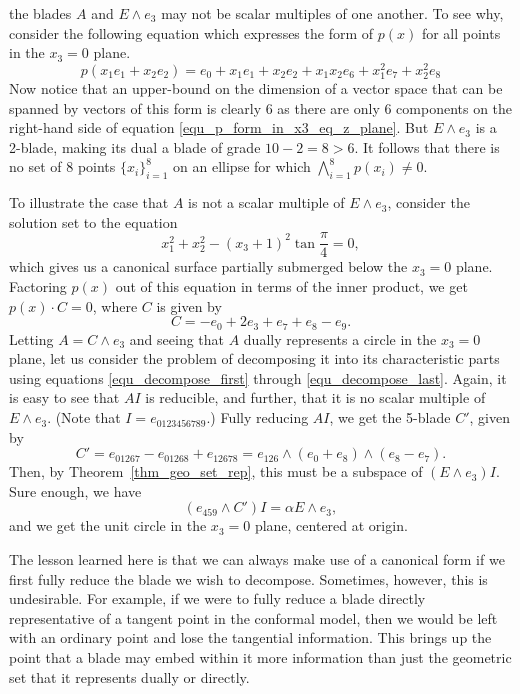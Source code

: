 \documentclass{birkjour}
\theoremstyle{definition}
\theoremstyle{remark}
\numberwithin{equation}{section}
\begin{document}
the blades $A$ and $E\wedge e_3$ may not be scalar multiples of one another.
To see why, consider the following equation which expresses the form of $p(x)$ for all points in the $x_3=0$ plane.
\begin{equation}\label{equ_p_form_in_x3_eq_z_plane}
p(x_1e_1+x_2e_2)=e_0 + x_1e_1 + x_2e_2 + x_1x_2e_6 + x_1^2e_7 + x_2^2e_8
\end{equation}
Now notice that an upper-bound on the dimension of a vector space that can be spanned by vectors
of this form is clearly 6 as there are only 6 components on the right-hand side of equation \eqref{equ_p_form_in_x3_eq_z_plane}.
But $E\wedge e_3$ is a 2-blade, making its dual a blade of grade $10-2=8>6$.  It follows that there is no set of
8 points $\{x_i\}_{i=1}^8$ on an ellipse for which $\bigwedge_{i=1}^8 p(x_i)\neq 0$.

To illustrate the case that $A$ is not a scalar multiple of $E\wedge e_3$, consider the solution set
to the equation
\begin{equation}
x_1^2 + x_2^2 - (x_3+1)^2\tan\frac{\pi}{4}=0,
\end{equation}
which gives us a canonical surface partially submerged below the $x_3=0$ plane.
Factoring $p(x)$ out of this equation in terms of the inner product, we get $p(x)\cdot C=0$,
where $C$ is given by
\begin{equation}
C = -e_0 + 2e_3 + e_7 + e_8 - e_9.
\end{equation}
Letting $A=C\wedge e_3$ and seeing that $A$ dually represents a circle in the $x_3=0$ plane, let us consider
the problem of decomposing it into its characteristic parts using equations
\eqref{equ_decompose_first} through \eqref{equ_decompose_last}.
Again, it is easy to see that $AI$ is reducible, and further, that it is no scalar multiple of $E\wedge e_3$.
(Note that $I=e_{0123456789}$.)
Fully reducing $AI$, we get the 5-blade $C'$, given by
\begin{equation}
C' = e_{01267} - e_{01268} + e_{12678} = e_{126}\wedge(e_0+e_8)\wedge(e_8-e_7).
\end{equation}
Then, by Theorem~\ref{thm_geo_set_rep}, this must be a subspace of $(E\wedge e_3)I$.
Sure enough, we have
\begin{equation}
(e_{459}\wedge C')I = \alpha E\wedge e_3,
\end{equation}
and we get the unit circle in the $x_3=0$ plane, centered at origin.

The lesson learned here is that we can always make use of a canonical form if we first
fully reduce the blade we wish to decompose.  Sometimes, however, this is undesirable.
For example, if we were to fully reduce a blade directly representative of a tangent
point in the conformal model, then we would be left with an ordinary point and lose the tangential information.
This brings up the point that a blade may embed within it more information than just the geometric
set that it represents dually or directly.
\end{document}
